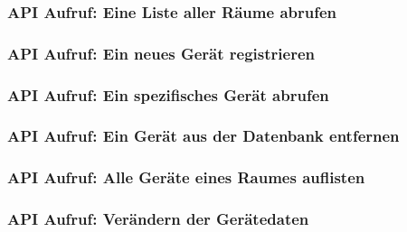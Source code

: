 \subsubsection{API Aufruf: Eine Liste aller Räume abrufen}
\label{app:API_show_rooms}

\subsubsection{API Aufruf: Ein neues Gerät registrieren}
\label{app:API_register_device}

\subsubsection{API Aufruf: Ein spezifisches Gerät abrufen}
\label{app:API_get_device}

\subsubsection{API Aufruf: Ein Gerät aus der Datenbank entfernen}
\label{app:API_delete_device}

\subsubsection{API Aufruf: Alle Geräte eines Raumes auflisten}
\label{app:API_show_devices}

\subsubsection{API Aufruf: Verändern der Gerätedaten}
\label{app:API_patch_device}




%

